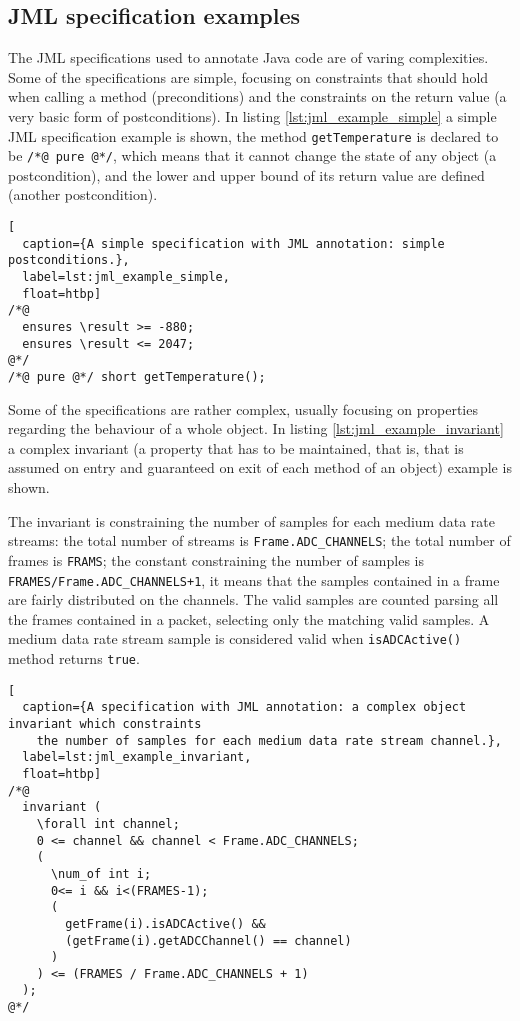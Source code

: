 \documentclass{article}
\newcommand{\lil}[1]{\texttt{\lstinline|#1|}}
\begin{document}
\subsection{JML specification examples}
\label{subsec:a_jml_specification_example}

The JML specifications used to annotate Java code are of varing complexities.
Some of the specifications are simple, focusing on constraints that should hold when 
calling a method (preconditions) and the constraints on the return value (a very basic form of 
postconditions).
In listing \ref{lst:jml_example_simple} a simple JML specification example is shown, the 
method \lil{getTemperature} is declared to be \lil{/*@ pure @*/}, which means that 
it cannot change the state of any object (a postcondition), and the lower and upper bound of 
its return value are defined (another postcondition).

\begin{lstlisting}[
  caption={A simple specification with JML annotation: simple postconditions.},
  label=lst:jml_example_simple,
  float=htbp]
/*@ 
  ensures \result >= -880;
  ensures \result <= 2047;
@*/
/*@ pure @*/ short getTemperature();
\end{lstlisting}

Some of the specifications are rather complex, usually focusing on properties regarding the 
behaviour of a whole object.
In listing \ref{lst:jml_example_invariant} a complex invariant 
(a property that has to be maintained, that is, that is assumed on entry and guaranteed on 
exit of each method of an object)
example is shown. 

\sloppy

The invariant is constraining the number of samples for each medium data rate streams: 
the total number of streams is \lil{Frame.ADC_CHANNELS}; the total number of frames is 
\lil{FRAMS}; the constant constraining the number of samples is 
\lil{FRAMES/Frame.ADC_CHANNELS+1}, it means that the samples contained in a frame are
fairly distributed on the channels. 
The valid samples are counted parsing all the frames contained in a packet, selecting only 
the matching valid samples.
A medium data rate stream sample is considered valid when \lil{isADCActive()} method 
returns \lil{true}.

\fussy

\begin{lstlisting}[
  caption={A specification with JML annotation: a complex object invariant which constraints 
    the number of samples for each medium data rate stream channel.},
  label=lst:jml_example_invariant,
  float=htbp]
/*@ 
  invariant (
    \forall int channel;
    0 <= channel && channel < Frame.ADC_CHANNELS; 
    (
      \num_of int i;
      0<= i && i<(FRAMES-1);
      (
        getFrame(i).isADCActive() &&
        (getFrame(i).getADCChannel() == channel)
      )
    ) <= (FRAMES / Frame.ADC_CHANNELS + 1)
  );
@*/
\end{lstlisting}
\end{document}
